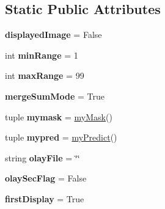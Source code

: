 \subsection*{Static Public Attributes}
\begin{DoxyCompactItemize}
\item 
\hypertarget{classAtrex_1_1Atrex_adb81a9472392a89ed733d7d0779e45b7}{{\bfseries displayed\-Image} = False}\label{classAtrex_1_1Atrex_adb81a9472392a89ed733d7d0779e45b7}

\item 
\hypertarget{classAtrex_1_1Atrex_ae832c8b0566a3106d3021b88ea739683}{int {\bfseries min\-Range} = 1}\label{classAtrex_1_1Atrex_ae832c8b0566a3106d3021b88ea739683}

\item 
\hypertarget{classAtrex_1_1Atrex_ad050fe0947cfc2aaed121ca1f306d637}{int {\bfseries max\-Range} = 99}\label{classAtrex_1_1Atrex_ad050fe0947cfc2aaed121ca1f306d637}

\item 
\hypertarget{classAtrex_1_1Atrex_a68605f5249c1a23ea96180aa7c011acd}{{\bfseries merge\-Sum\-Mode} = True}\label{classAtrex_1_1Atrex_a68605f5249c1a23ea96180aa7c011acd}

\item 
\hypertarget{classAtrex_1_1Atrex_af008dc7c13f040fea0e0bd315badd461}{tuple {\bfseries mymask} = \hyperlink{classmyMask_1_1myMask}{my\-Mask}()}\label{classAtrex_1_1Atrex_af008dc7c13f040fea0e0bd315badd461}

\item 
\hypertarget{classAtrex_1_1Atrex_af1384190082613188d50f79e7dacb4d4}{tuple {\bfseries mypred} = \hyperlink{classmyPredict_1_1myPredict}{my\-Predict}()}\label{classAtrex_1_1Atrex_af1384190082613188d50f79e7dacb4d4}

\item 
\hypertarget{classAtrex_1_1Atrex_a6c119a7ed751e933a34e165078520474}{string {\bfseries olay\-File} = \char`\"{}\char`\"{}}\label{classAtrex_1_1Atrex_a6c119a7ed751e933a34e165078520474}

\item 
\hypertarget{classAtrex_1_1Atrex_a2ae7c7ded99e983cf654f68a09974198}{{\bfseries olay\-Sec\-Flag} = False}\label{classAtrex_1_1Atrex_a2ae7c7ded99e983cf654f68a09974198}

\item 
\hypertarget{classAtrex_1_1Atrex_a227e61447cc5900a7a818713fffb4d9e}{{\bfseries first\-Display} = True}\label{classAtrex_1_1Atrex_a227e61447cc5900a7a818713fffb4d9e}


\end{DoxyCompactItemize}
